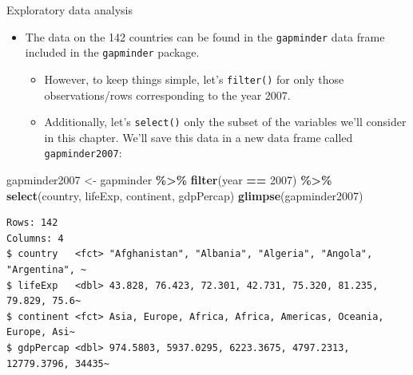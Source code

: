 \documentclass[
  ignorenonframetext,
]{beamer}
\newenvironment{Shaded}{\begin{snugshade}}{\end{snugshade}}
\newcommand{\DecValTok}[1]{\textcolor[rgb]{0.00,0.00,0.81}{#1}}
\newcommand{\FunctionTok}[1]{\textcolor[rgb]{0.13,0.29,0.53}{\textbf{#1}}}
\newcommand{\NormalTok}[1]{#1}
\newcommand{\OtherTok}[1]{\textcolor[rgb]{0.56,0.35,0.01}{#1}}
\newcommand{\SpecialCharTok}[1]{\textcolor[rgb]{0.81,0.36,0.00}{\textbf{#1}}}
\providecommand{\tightlist}{%
  \setlength{\itemsep}{0pt}\setlength{\parskip}{0pt}}
\begin{document}
\begin{frame}[fragile]{Exploratory data analysis}
\protect\hypertarget{exploratory-data-analysis}{}
\begin{itemize}
\item
  The data on the 142 countries can be found in the \texttt{gapminder}
  data frame included in the \texttt{gapminder} package.

  \begin{itemize}
  \tightlist
  \item
    However, to keep things simple, let's \texttt{filter()} for only
    those observations/rows corresponding to the year 2007.
  \item
    Additionally, let's \texttt{select()} only the subset of the
    variables we'll consider in this chapter. We'll save this data in a
    new data frame called \texttt{gapminder2007}:
  \end{itemize}
\end{itemize}

\small

\begin{Shaded}
\begin{Highlighting}[]
\NormalTok{gapminder2007 }\OtherTok{\textless{}{-}}\NormalTok{ gapminder }\SpecialCharTok{\%\textgreater{}\%} 
  \FunctionTok{filter}\NormalTok{(year }\SpecialCharTok{==} \DecValTok{2007}\NormalTok{) }\SpecialCharTok{\%\textgreater{}\%}
  \FunctionTok{select}\NormalTok{(country, lifeExp, continent, gdpPercap)}
\FunctionTok{glimpse}\NormalTok{(gapminder2007)}
\end{Highlighting}
\end{Shaded}

\begin{verbatim}
Rows: 142
Columns: 4
$ country   <fct> "Afghanistan", "Albania", "Algeria", "Angola", "Argentina", ~
$ lifeExp   <dbl> 43.828, 76.423, 72.301, 42.731, 75.320, 81.235, 79.829, 75.6~
$ continent <fct> Asia, Europe, Africa, Africa, Americas, Oceania, Europe, Asi~
$ gdpPercap <dbl> 974.5803, 5937.0295, 6223.3675, 4797.2313, 12779.3796, 34435~
\end{verbatim}

\normalsize
\end{frame}
\end{document}
